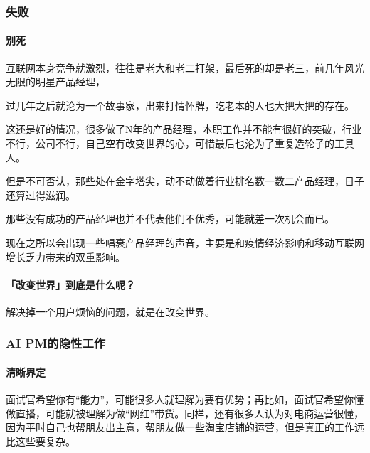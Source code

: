 \documentclass[letterpaper,11pt,english]{sphinxmanual}
\begin{document}
\subsubsection{失败}
\label{\detokenize{chapter_experience/fail:id1}}\label{\detokenize{chapter_experience/fail::doc}}

\paragraph{别死}
\label{\detokenize{chapter_experience/fail:id2}}
互联网本身竞争就激烈，往往是老大和老二打架，最后死的却是老三，前几年风光无限的明星产品经理，

过几年之后就沦为一个故事家，出来打情怀牌，吃老本的人也大把大把的存在。

这还是好的情况，很多做了N年的产品经理，本职工作并不能有很好的突破，行业不行，公司不行，自己空有改变世界的心，可惜最后也沦为了重复造轮子的工具人。

但是不可否认，那些处在金字塔尖，动不动做着行业排名数一数二产品经理，日子还算过得滋润。

那些没有成功的产品经理也并不代表他们不优秀，可能就差一次机会而已。

现在之所以会出现一些唱衰产品经理的声音，主要是和疫情经济影响和移动互联网增长乏力带来的双重影响。


\paragraph{「改变世界」到底是什么呢？}
\label{\detokenize{chapter_experience/fail:id3}}
解决掉一个用户烦恼的问题，就是在改变世界。


\subsubsection{AI PM的隐性工作}
\label{\detokenize{chapter_experience/recessive_work:ai-pm}}\label{\detokenize{chapter_experience/recessive_work::doc}}

\paragraph{清晰界定}
\label{\detokenize{chapter_experience/recessive_work:id1}}
面试官希望你有“能力”，可能很多人就理解为要有优势；再比如，面试官希望你懂做直播，可能就被理解为做“网红”带货。同样，还有很多人认为对电商运营很懂，因为平时自己也帮朋友出主意，帮朋友做一些淘宝店铺的运营，但是真正的工作远比这些要复杂。
%
\begin{footnote}[629]\sphinxAtStartFootnote
{}
%
\end{footnote}
\end{document}

